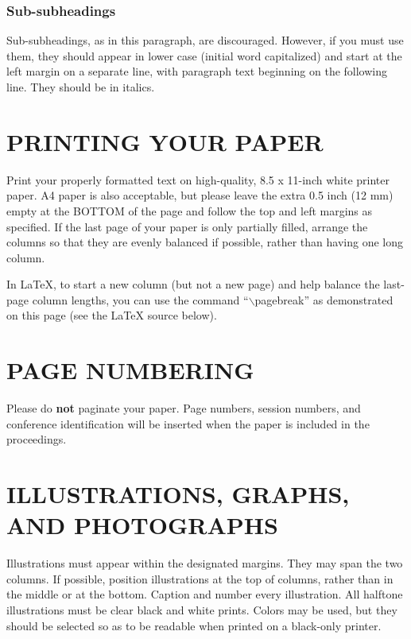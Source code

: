 \documentclass{article}
\begin{document}
\subsubsection{Sub-subheadings}
\label{sssec:subsubhead}

Sub-subheadings, as in this paragraph, are discouraged. However, if you
must use them, they should appear in lower case (initial word
capitalized) and start at the left margin on a separate line, with paragraph
text beginning on the following line.  They should be in italics.

\section{PRINTING YOUR PAPER}
\label{sec:print}

Print your properly formatted text on high-quality, 8.5 x 11-inch white printer
paper. A4 paper is also acceptable, but please leave the extra 0.5 inch (12 mm)
empty at the BOTTOM of the page and follow the top and left margins as
specified.  If the last page of your paper is only partially filled, arrange
the columns so that they are evenly balanced if possible, rather than having
one long column.

In LaTeX, to start a new column (but not a new page) and help balance the
last-page column lengths, you can use the command ``$\backslash$pagebreak'' as
demonstrated on this page (see the LaTeX source below).

\section{PAGE NUMBERING}
\label{sec:page}

Please do {\bf not} paginate your paper.  Page numbers, session numbers, and
conference identification will be inserted when the paper is included in the
proceedings.

\section{ILLUSTRATIONS, GRAPHS, AND PHOTOGRAPHS}
\label{sec:illust}

Illustrations must appear within the designated margins.  They may span the two
columns.  If possible, position illustrations at the top of columns, rather
than in the middle or at the bottom.  Caption and number every illustration.
All halftone illustrations must be clear black and white prints.  Colors may be
used, but they should be selected so as to be readable when printed on a
black-only printer.
\end{document}
